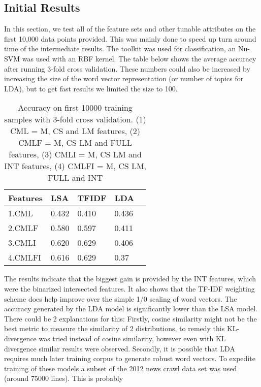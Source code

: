 \documentclass[11pt]{article}
\begin{document}
\subsection{Initial Results}
In this section, we test all of the feature sets and other tunable attributes on
the first 10,000 data points provided. This was mainly done to speed up turn
around time of the intermediate results. The \cite{scikit-learn} toolkit was used for
classification, an  Nu-SVM was used with an RBF kernel. 
The table below shows the average accuracy after running 3-fold cross validation. 
These numbers could also be increased by increasing the size of the word vector 
representation (or number of topics for LDA), but to get fast results we limited the size to 100.
\begin{table}[h]
\begin{center}
\begin{singlespace}
\begin{tabular}{|l|l|l|l|l|}
\hline \bf Features & \bf LSA & \bf TFIDF  & \bf LDA \\ \hline
1.CML &0.432& 0.410 & 0.436\\
2.CMLF &0.580 & 0.597&0.411\\
3.CMLI & 0.620 & 0.629&0.406\\
4.CMLFI&0.616& 0.629&0.37 \\
\hline
\end{tabular}
\end{singlespace}
\end{center}
\caption{ Accuracy on first 10000 training samples with 3-fold cross validation.
  (1) CML = M, CS and LM features, 
  (2) CMLF = M, CS LM and FULL features,
  (3) CMLI = M, CS LM and INT features,
  (4) CMLFI = M, CS LM, FULL and INT}
\end{table}
The results indicate that the biggest gain is provided by the INT features,
which were the binarized intersected features. It also shows that the TF-IDF
weighting scheme does help improve over the simple 1/0 scaling of word vectors.
The accuracy generated by the LDA model is significantly lower than the LSA
model. There could be 2 explanations for this: Firstly, cosine similarity might
not be the best metric to measure the similarity of 2 distributions, to remedy this
KL-divergence was tried instead of cosine similarity, however even with KL
divergence similar results were observed. Secondly, it is possible that LDA requires much later training corpus
to generate robust word vectors. To expedite training of these models a subset
of the 2012 news crawl data set was used (around 75000 lines). This is probably
\end{document}
